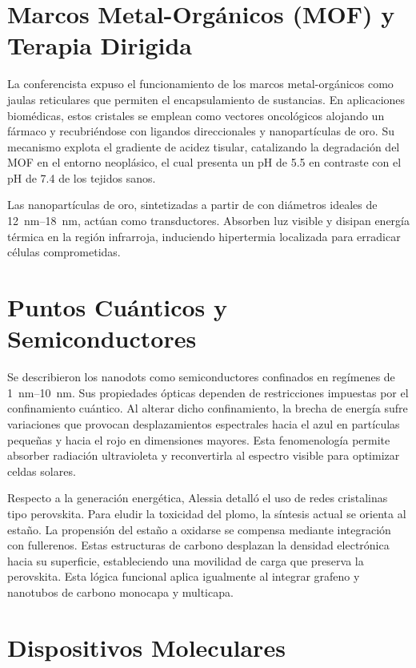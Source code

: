 \documentclass[pdflatex,sn-mathphys-num]{sn-jnl}
\theoremstyle{thmstyleone}%
\theoremstyle{thmstyletwo}%
\theoremstyle{thmstylethree}%
\begin{document}
\section{Marcos Metal-Orgánicos (MOF) y Terapia Dirigida}
\label{sec:mof}

La conferencista expuso el funcionamiento de los marcos metal-orgánicos como
jaulas reticulares que permiten el encapsulamiento de sustancias.
En aplicaciones biomédicas, estos cristales se emplean como
vectores oncológicos alojando un fármaco y recubriéndose con ligandos
direccionales y nanopartículas de oro. Su mecanismo explota
el gradiente de acidez tisular, catalizando la degradación del MOF en el
entorno neoplásico, el cual presenta un pH de \num{5.5} en contraste con el
pH de \num{7.4} de los tejidos sanos.

Las nanopartículas de oro, sintetizadas a partir de  con
diámetros ideales de \qtyrange{12}{18}{\nano\meter}, actúan
como transductores. Absorben luz visible y disipan energía
térmica en la región infrarroja, induciendo hipertermia localizada para
erradicar células comprometidas.

\section{Puntos Cuánticos y Semiconductores}
\label{sec:semiconductores}

Se describieron los nanodots como semiconductores confinados en regímenes de
\qtyrange{1}{10}{\nano\meter}.
Sus propiedades ópticas dependen de restricciones impuestas por el confinamiento
cuántico.
Al alterar dicho confinamiento, la brecha de energía sufre variaciones que
provocan desplazamientos espectrales hacia el azul en partículas pequeñas y
hacia el rojo en dimensiones mayores. Esta fenomenología permite
absorber radiación ultravioleta y reconvertirla al espectro visible para
optimizar celdas solares.

Respecto a la generación energética, Alessia detalló el uso de redes
cristalinas tipo perovskita. Para eludir la toxicidad del plomo,
la síntesis actual se orienta al estaño. La propensión del
estaño a oxidarse se compensa mediante integración con fullerenos.
Estas estructuras de carbono desplazan la densidad electrónica
hacia su superficie, estableciendo una movilidad de carga que preserva la
perovskita. Esta lógica funcional aplica igualmente al
integrar grafeno y nanotubos de carbono monocapa y multicapa.

\section{Dispositivos Moleculares}
\label{sec:dispositivos}
\end{document}
